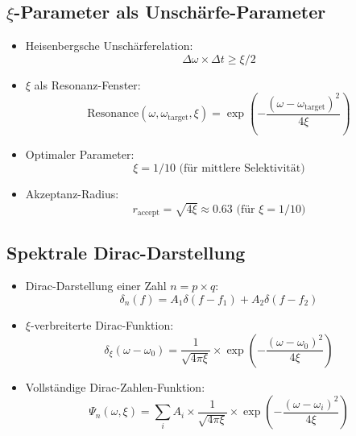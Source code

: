 \documentclass[12pt,a4paper]{article}
\begin{document}
	\subsection{$\xi$-Parameter als Unschärfe-Parameter}
	\begin{itemize}
		\item Heisenbergsche Unschärferelation:
		\begin{equation}
			\Delta\omega \times \Delta t \geq \xi/2
		\end{equation}
		
		\item $\xi$ als Resonanz-Fenster:
		\begin{equation}
			\text{Resonance}(\omega, \omega_{\text{target}}, \xi) = \exp\left(-\frac{(\omega-\omega_{\text{target}})^2}{4\xi}\right)
		\end{equation}
		
		\item Optimaler Parameter:
		\begin{equation}
			\xi = 1/10 \text{ (für mittlere Selektivität)}
		\end{equation}
		
		\item Akzeptanz-Radius:
		\begin{equation}
			r_{\text{accept}} = \sqrt{4\xi} \approx 0.63 \text{ (für } \xi = 1/10)
		\end{equation}
	\end{itemize}
	
	\subsection{Spektrale Dirac-Darstellung}
	\begin{itemize}
		\item Dirac-Darstellung einer Zahl $n = p \times q$:
		\begin{equation}
			\delta_n(f) = A_1\delta(f - f_1) + A_2\delta(f - f_2)
		\end{equation}
		
		\item $\xi$-verbreiterte Dirac-Funktion:
		\begin{equation}
			\delta_\xi(\omega - \omega_0) = \frac{1}{\sqrt{4\pi\xi}} \times \exp\left(-\frac{(\omega-\omega_0)^2}{4\xi}\right)
		\end{equation}
		
		\item Vollständige Dirac-Zahlen-Funktion:
		\begin{equation}
			\Psi_n(\omega,\xi) = \sum_i A_i \times \frac{1}{\sqrt{4\pi\xi}} \times \exp\left(-\frac{(\omega-\omega_i)^2}{4\xi}\right)
		\end{equation}
	\end{itemize}
	
\end{document}
